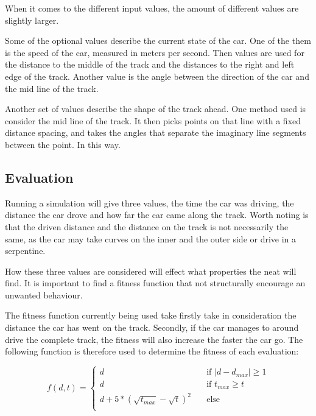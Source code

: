 When it comes to the different input values, the amount of different values are slightly larger.

Some of the optional values describe the current state of the car. One of the them is the speed of the car, measured in meters per second. Then values are used for the distance to the middle of the track and the distances to the right and left edge of the track. Another value is the angle between the direction of the car and the mid line of the track.

Another set of values describe the shape of the track ahead. One method used is consider the mid line of the track. It then picks points on that line with a fixed distance spacing, and takes the angles that separate the imaginary line segments between the point. In this way.

\subsection{Evaluation}

Running a simulation will give three values, the time the car was driving, the distance the car drove and how far the car came along the track. Worth noting is that the driven distance and the distance on the track is not necessarily the same, as the car may take curves on the inner and the outer side or drive in a serpentine.

How these three values are considered will effect what properties the neat will find. It is important to find a fitness function that not structurally encourage an unwanted behaviour.

The fitness function currently being used take firstly take in consideration the distance the car has went on the track. Secondly, if the car manages to around drive the complete track, the fitness will also increase the faster the car go. The following function is therefore used to determine the fitness of each evaluation:


\[ f(d, t) =
  \begin{cases}
    d    & \quad \text{if } |d-d_{max}|\geq 1\\
    d    & \quad \text{if } t_{max} \geq t\\
    d + 5*(\sqrt{t_{max}} - \sqrt{t})^2    &\quad \text{else} \\
  \end{cases}
\]

